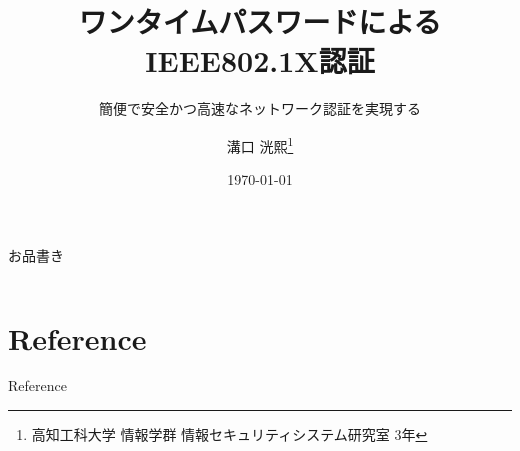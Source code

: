\documentclass[aspectratio=43]{beamer}
\title{ワンタイムパスワードによるIEEE802.1X認証}
\subtitle{簡便で安全かつ高速なネットワーク認証を実現する}
\author[K.MIZOGUCHI]{溝口 洸熙\thanks{高知工科大学 情報学群 情報セキュリティシステム研究室 3年}}
\date{\today}
\newcommand{\stoc}{1-4}
\newcommand{\ftoc}{5-7}
\begin{document}
\maketitle

\begin{frame}[t]{お品書き}
    \begin{columns}[t]
        \begin{column}{.48\textwidth}
            \tableofcontents[sections=\stoc]
        \end{column}
        \begin{column}{.48\textwidth}
            \tableofcontents[sections=\ftoc]
        \end{column}
    \end{columns}
\end{frame}









\section{Reference}
\begin{frame}[allowframebreaks]{Reference}
    \printbibliography
\end{frame}
\end{document}
